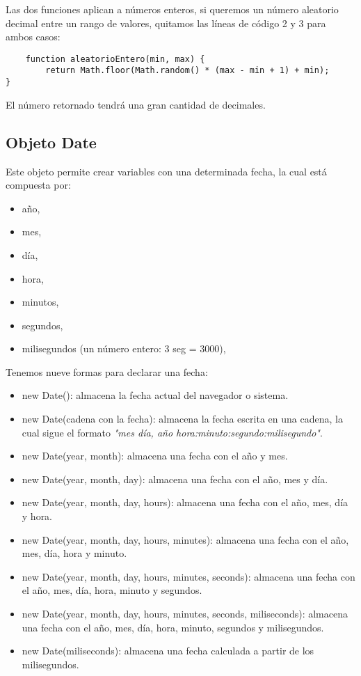 Las dos funciones aplican a números enteros, si queremos un número aleatorio decimal entre un rango de valores, quitamos las líneas de código 2 y 3 para ambos casos:

\begin{lstlisting}
    function aleatorioEntero(min, max) {
        return Math.floor(Math.random() * (max - min + 1) + min);
}
\end{lstlisting}

El número retornado tendrá una gran cantidad de decimales.


\subsection{Objeto Date}

Este objeto permite crear variables con una determinada fecha, la cual está compuesta por:
\begin{itemize}
    \item año,
    \item mes,
    \item día,
    \item hora,
    \item minutos,
    \item segundos,
    \item milisegundos (un número entero: 3 seg = 3000),
\end{itemize}

Tenemos nueve formas para declarar una fecha:
\begin{itemize}
    \item new Date(): almacena la fecha actual del navegador o sistema.
    \item new Date(cadena con la fecha): almacena la fecha escrita en una cadena, la cual sigue el formato \textit{"mes día, año hora:minuto:segundo:milisegundo"}.
    \item new Date(year, month): almacena una fecha con el año y mes.
    \item new Date(year, month, day): almacena una fecha con el año, mes y día.
    \item new Date(year, month, day, hours): almacena una fecha con el año, mes, día y hora.
    \item new Date(year, month, day, hours, minutes): almacena una fecha con el año, mes, día, hora y minuto.
    \item new Date(year, month, day, hours, minutes, seconds): almacena una fecha con el año, mes, día, hora, minuto y segundos.
    \item new Date(year, month, day, hours, minutes, seconds, miliseconds): almacena una fecha con el año, mes, día, hora, minuto, segundos y milisegundos.
    \item new Date(miliseconds): almacena una fecha calculada a partir de los milisegundos.
\end{itemize}

